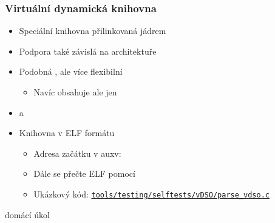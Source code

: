 \begin{frame}
  \frametitle{Virtuální dynamická knihovna}

  \begin{itemize}
    \item Speciální knihovna přilinkovaná jádrem
    \item Podpora také závislá na architektuře

    \item Podobná , ale více flexibilní
    \begin{itemize}
      \item Navíc obsahuje ale jen 
    \end{itemize}

    \pause

    \item {}  a 

    \pause

    \item Knihovna v ELF formátu
    \begin{itemize}
      \item Adresa začátku v auxv: 
      \item Dále se přečte ELF pomocí 
      \item Ukázkový kód: \href{https://git.kernel.org/cgit/linux/kernel/git/torvalds/linux.git/tree/tools/testing/selftests/vDSO/parse_vdso.c?id=f9b6b0ef60349cf1747d8f366f23900671f888c5}{\nolinkurl{tools/testing/selftests/vDSO/parse_vdso.c}}
    \end{itemize}
  \end{itemize}

  \iffimuni
  \pause
  \bigskip

   domácí úkol
  \fi

\end{frame}
